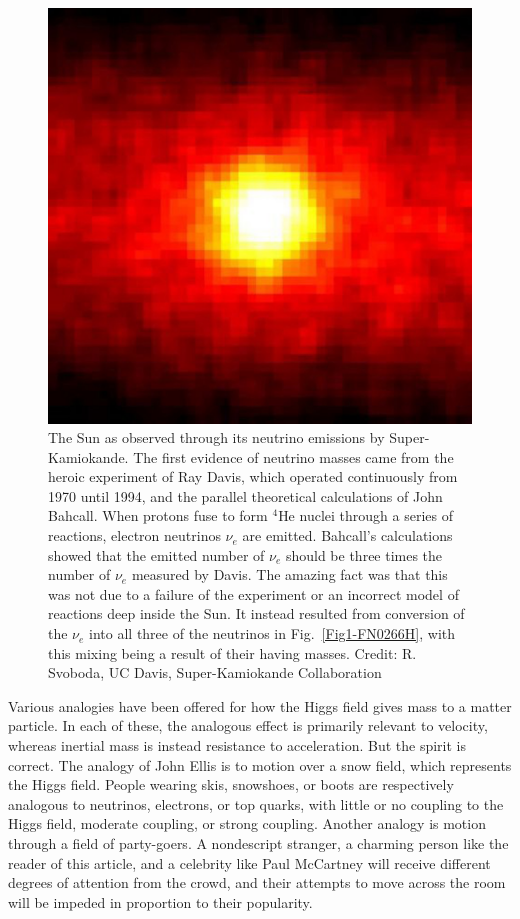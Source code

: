 \documentclass[12pt]{iopart}
\begin{document}
\begin{figure}[htbp]
\centering
\includegraphics[bb=0 0 360 360, width=5in]{Fig7-Sun-neutrinos.eps}
\caption{The Sun as observed through its neutrino emissions by Super-Kamiokande. The first evidence of neutrino masses came from the heroic experiment of Ray Davis, which operated continuously from 1970 until 1994, and the parallel theoretical calculations of John Bahcall. When protons fuse to form $^4$He nuclei through a series of  reactions, electron neutrinos $\nu_e$ are emitted. Bahcall's calculations showed that the emitted number of $\nu_e$ should be three times the number of $\nu_e$ measured by Davis. The amazing fact was that this was not due to a failure of the experiment or an incorrect model of reactions deep inside the Sun. It instead resulted from conversion of the $\nu_e$ into all three of the neutrinos in Fig.~\ref{Fig1-FN0266H}, with this mixing being a result of their having masses. Credit: R. Svoboda, UC Davis, Super-Kamiokande Collaboration \label{Fig7-Sun-neutrinos.eps}}
\end{figure}

Various analogies have been offered for how the Higgs field gives mass to a matter particle. In each of these, the analogous effect is primarily relevant to velocity, whereas inertial mass is instead resistance to acceleration. But the spirit is correct. The analogy of John Ellis is to motion over a snow field, which represents the Higgs field. People wearing skis, snowshoes, or boots are respectively analogous to neutrinos, electrons, or top quarks, with little or no coupling to the Higgs field, moderate coupling, or strong coupling. Another analogy is motion through a field of party-goers. A nondescript stranger, a charming person like the reader of this article, and a celebrity like Paul McCartney will receive different degrees of attention from the crowd, and their attempts to move across the room will be impeded in proportion to their popularity.
\end{document}
